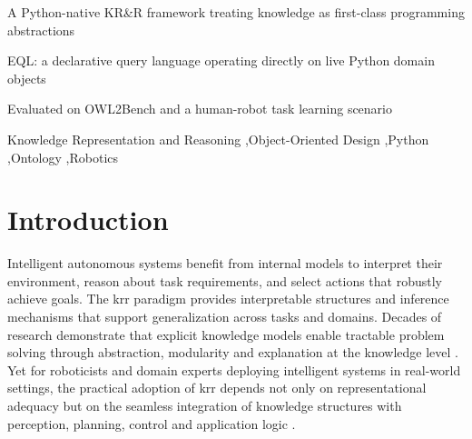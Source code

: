 \documentclass[a4paper,fleqn]{cas-sc}
\begin{document}

\begin{abstract}
This paper introduces KRROOD, a framework designed to bridge the integration gap between modern software engineering and \ac{krr} systems. While \ac{oop} is the standard for developing complex applications, existing \ac{krr} frameworks often rely on external ontologies and specialized languages that are difficult to integrate with imperative code. KRROOD addresses this by treating knowledge as a first-class programming abstraction using native class structures, bridging the gap between the logic programming and OOP paradigms. We evaluate the system on the OWL2Bench benchmark and a human-robot task learning scenario. Experimental results show that KRROOD achieves strong performance while supporting the expressive reasoning required for real-world autonomous systems.
\end{abstract}

\begin{highlights}
\item A Python-native KR\&R framework treating knowledge as first-class programming abstractions
\item EQL: a declarative query language operating directly on live Python domain objects
\item Evaluated on OWL2Bench and a human-robot task learning scenario
\end{highlights}

\begin{keywords}
Knowledge Representation and Reasoning \sep Object-Oriented Design \sep Python \sep Ontology \sep Robotics
\end{keywords}

\maketitle

\section{Introduction}
\label{sec:introduction}

Intelligent autonomous systems benefit from internal models to interpret their environment, reason about task requirements, and select actions that robustly achieve goals. The \acf{krr} paradigm provides interpretable structures and inference mechanisms that support generalization across tasks and domains. Decades of research demonstrate that explicit knowledge models enable tractable problem solving through abstraction, modularity and explanation at the knowledge level \citep{delgrande2024current,newell1982knowledge}. Yet for roboticists and domain experts deploying intelligent systems in real-world settings, the practical adoption of \ac{krr} depends not only on representational adequacy but on the seamless integration of knowledge structures with perception, planning, control and application logic \citep{toberg2024commonsense}.
\end{document}

